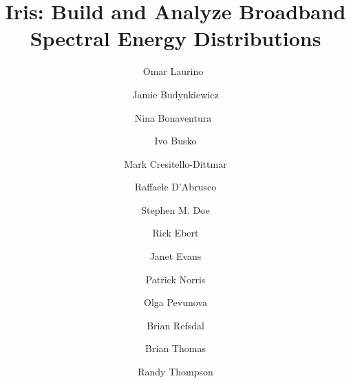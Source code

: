 \documentclass[5p]{elsarticle}
\begin{document}
\begin{frontmatter}



\title{Iris: Build and Analyze Broadband Spectral Energy Distributions}

\author[sao]{Omar Laurino~}
 
\author[sao]{Jamie Budynkiewicz}

\author[sao]{Nina Bonaventura~}

\author[stsci]{Ivo Busko}

\author[sao]{Mark Cresitello-Dittmar}

\author[sao]{Raffaele D'Abrusco}

\author[sao]{Stephen M. Doe}

\author[ipac]{Rick Ebert}

\author[sao]{Janet Evans}

\author[noao]{Patrick Norris}

\author[ipac]{Olga Pevunova}

\author[sao]{Brian Refsdal}

\author[noao]{Brian Thomas}

\author[stsci]{Randy Thompson}


\end{frontmatter}
\end{document}

